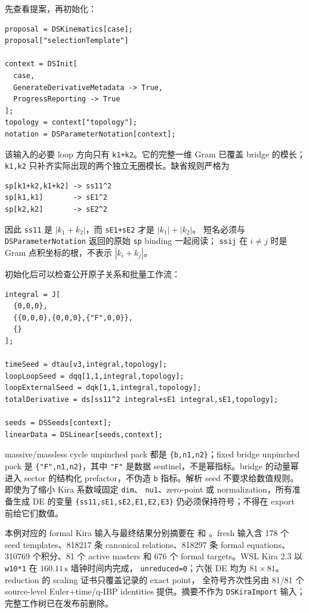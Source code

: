 ﻿\documentclass[a4paper,11pt]{article}
\begin{document}
先查看提案，再初始化：
\begin{verbatim}
proposal = DSKinematics[case];
proposal["selectionTemplate"]

context = DSInit[
  case,
  GenerateDerivativeMetadata -> True,
  ProgressReporting -> True
];
topology = context["topology"];
notation = DSParameterNotation[context];
\end{verbatim}
该输入的必要 loop 方向只有 \texttt{k1+k2}。它的完整一维 Gram 已覆盖 bridge 的模长；
\texttt{k1,k2} 只补齐实际出现的两个独立无圈模长。缺省规则严格为
\begin{verbatim}
sp[k1+k2,k1+k2] -> ss11^2
sp[k1,k1]       -> sE1^2
sp[k2,k2]       -> sE2^2
\end{verbatim}
因此 \texttt{ss11} 是 $|k_1+k_2|$，而 \texttt{sE1+sE2} 才是 $|k_1|+|k_2|$。
短名必须与 \texttt{DSParameterNotation} 返回的原始 \texttt{sp} binding 一起阅读；
\texttt{ssij} 在 $i\ne j$ 时是 Gram 点积坐标的根，不表示 $|k_i+k_j|$。

初始化后可以检查公开原子关系和批量工作流：
\begin{verbatim}
integral = J[
  {0,0,0},
  {{0,0,0},{0,0,0},{"F",0,0}},
  {}
];

timeSeed = dtau[v3,integral,topology];
loopLoopSeed = dqq[1,1,integral,topology];
loopExternalSeed = dqk[1,1,integral,topology];
totalDerivative = ds[ss11^2 integral+sE1 integral,sE1,topology];

seeds = DSSeeds[context];
linearData = DSLinear[seeds,context];
\end{verbatim}
massive/massless cycle unpinched pack 都是 \texttt{\{b,n1,n2\}}；fixed bridge unpinched pack 是
\texttt{\{"F",n1,n2\}}，其中 \texttt{"F"} 是数据 sentinel，不是幂指标。bridge 的动量幂进入
sector 的结构化 prefactor，不伪造 \texttt{b} 指标。解析 seed 不要求给数值规则。即使为了缩小 Kira 系数域固定 \texttt{dim}、
\texttt{nu1}、zero-point 或 normalization，所有准备生成 DE 的变量
\texttt{\{ss11,sE1,sE2,E1,E2,E3\}} 仍必须保持符号；不得在 export 前给它们数值。

本例对应的 formal Kira 输入与最终结果分别摘要在
 和
。fresh 输入含 178 个 seed templates、818217 条
canonical relations、818297 条 formal equations、310769 个积分、81 个 active masters 和 676 个
formal targets。WSL Kira 2.3 以 \texttt{w10*1} 在 $160.11\,\mathrm{s}$ 墙钟时间内完成，
\texttt{unreduced=0}；六张 DE 均为 $81\times81$。reduction 的 scaling 证书只覆盖记录的 exact point，
全符号齐次性另由 81/81 个 source-level Euler+time/q-IBP identities 提供。摘要不作为
\texttt{DSKiraImport} 输入；完整工作树已在发布前删除。
\end{document}
